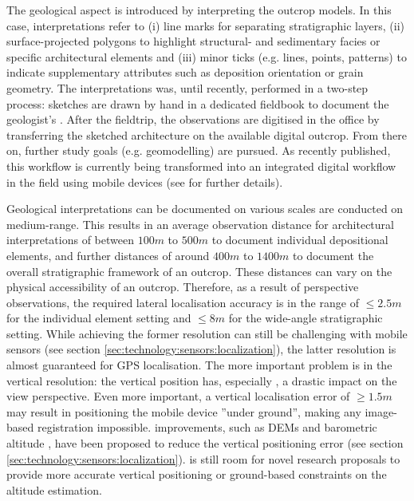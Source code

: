 \documentclass[review]{elsarticle}
\begin{document}
The geological aspect is introduced by interpreting the outcrop models. In this case, interpretations refer to (i) line marks for separating stratigraphic layers, (ii) surface-projected polygons to highlight structural- and sedimentary facies or specific architectural elements and (iii) minor ticks (e.g. lines, points, patterns) to indicate supplementary attributes such as deposition orientation or grain geometry. The interpretations was, until recently, performed in a two-step process: sketches are drawn by hand in a dedicated fieldbook to document the geologist's . After the fieldtrip, the observations are digitised in the office by transferring the sketched architecture on the available digital outcrop. From there on, further study goals (e.g. geomodelling) are pursued. As recently published, this workflow is currently being transformed into an integrated digital workflow in the field using mobile devices (see \cite{Kehl2018_AGU} for further details).

Geological interpretations can be documented on various scales  are conducted on medium-range. This results in an average observation distance for architectural interpretations of between $100m$ to $500m$ to document individual depositional elements, and further distances of around $400m$ to $1400m$ to document the overall stratigraphic framework of an outcrop. These distances can vary  on the physical accessibility of an outcrop. Therefore,  as a result of perspective observations, the required lateral localisation accuracy is in the range of $\leq 2.5m$ for the individual element setting and $\leq 8m$ for the wide-angle stratigraphic setting. While achieving the former resolution can still be challenging with mobile sensors (see section \ref{sec:technology:sensors:localization}), the latter resolution is almost guaranteed for \gls{GPS} localisation. The more important problem is in the vertical resolution: the vertical position has, especially , a drastic impact on the view perspective. Even more important, a vertical localisation error of  $\geq 1.5m$ may result in positioning the mobile device ''under ground'', making any image-based registration impossible.  improvements, such as \glspl{DEM} and barometric altitude \cite{Kehl2017_VGC}, have been proposed to reduce the vertical positioning error (see section \ref{sec:technology:sensors:localization}).  is still room for novel research proposals to provide more accurate vertical positioning or ground-based constraints on the altitude estimation.
\end{document}
